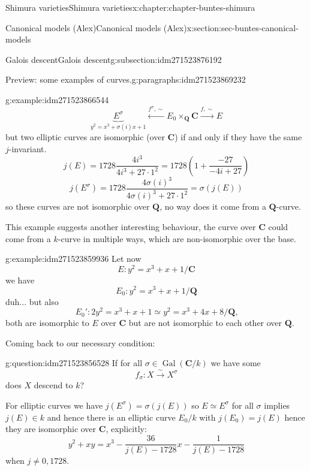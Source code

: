 \documentclass[oneside,10pt,]{book}
\numberwithin{equation}{section}
\newcommand{\QQ}{\mathbf{Q}}
\newcommand{\CC}{\mathbf{C}}
\newcommand{\Gal}[2]{\operatorname{Gal}(#1/#2)}
\begin{document}
\begin{chapterptx}{Shimura varieties}{}{Shimura varieties}{}{}{x:chapter:chapter-buntes-shimura}
\begin{sectionptx}{Canonical models (Alex)}{}{Canonical models (Alex)}{}{}{x:section:sec-buntes-canonical-models}
\begin{subsectionptx}{Galois descent}{}{Galois descent}{}{}{g:subsection:idm271523876192}
\begin{paragraphs}{Preview: some examples of curves.}{g:paragraphs:idm271523869232}
\begin{example}{}{g:example:idm271523866544}
\begin{equation*}
\underbrace{E^\sigma}_{y^2 = x^3 + \sigma(i)x + 1} \xleftarrow{f^\sigma, \sim} E_0 \times_\QQ \CC \xrightarrow{f,\sim} E
\end{equation*}
but two elliptic curves are isomorphic (over \(\CC\)) if and only if they have the same \(j\)-invariant.%
\begin{equation*}
j(E) = 1728 \frac{4i^3}{4i^3 + 27\cdot 1^2} = 1728\left(1+ \frac{ - 27}{-4i + 27}\right)
\end{equation*}
%
\begin{equation*}
j(E^\sigma) = 1728 \frac{4\sigma(i)^3}{4\sigma(i)^3 + 27\cdot 1^2} = \sigma(j(E))
\end{equation*}
so these curves are not isomorphic over \(\QQ\), no way does it come from a \(\QQ\)-curve.%
\end{example}
This example suggests another interesting behaviour, the curve over \(\CC\) could come from  a \(k\)-curve in multiple ways, which are non-isomorphic over the base.%
\begin{example}{}{g:example:idm271523859936}%
Let now%
\begin{equation*}
E \colon y^2 = x^3 + x + 1/\CC
\end{equation*}
we have%
\begin{equation*}
E_0 \colon y^2 = x^3 + x + 1/\QQ
\end{equation*}
duh... but also%
\begin{equation*}
E_0' \colon 2 y^2 = x^3 + x + 1 \simeq y^2 = x^3 + 4 x + 8/\QQ\text{,}
\end{equation*}
both are isomorphic to \(E\) over \(\CC\) but are not isomorphic to each other over \(\QQ\).%
\end{example}
Coming back to our necessary condition:%
\begin{question}{}{g:question:idm271523856528}%
If for all \(\sigma \in \Gal{\CC}{k}\) we have some%
\begin{equation*}
f_\sigma \colon X\xrightarrow{\sim} X^\sigma
\end{equation*}
does \(X\) descend to \(k\)?%
\end{question}
For elliptic curves we have \(j(E^\sigma) = \sigma(j(E))\) so \(E \simeq E^\sigma\) for all \(\sigma\) implies \(j(E) \in k\) and hence there is an elliptic curve \(E_0/ k\) with \(j(E_0) = j(E)\) hence they are isomorphic over \(\CC\), explicitly:%
\begin{equation*}
y^2 + xy = x^3 - \frac{36}{j(E) - 1728} x - \frac{1}{j(E) - 1728}
\end{equation*}
when \(j\ne 0,1728\).%

\end{paragraphs}
\end{subsectionptx}
\end{sectionptx}
\end{chapterptx}
\end{document}

